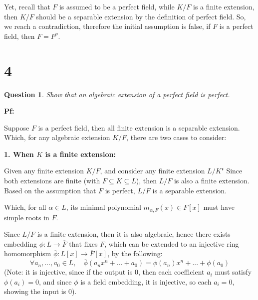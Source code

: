 \documentclass{article}
\newtheorem{question}{Question}
\begin{document}
Yet, recall that $F$ is assumed to be a perfect field, while $K/F$ is a finite extension, then $K/F$ should be a separable extension by the definition of perfect field. So, we reach a contradiction, therefore the initial assumption is false, if $F$ is a perfect field, then $F=F^p$.

\break

\section*{4}
\begin{myBox}[]{}
    \begin{question}
        Show that an algebraic extension of a perfect field is perfect.
    \end{question}
\end{myBox}

\textbf{Pf:}

Suppose $F$ is a perfect field, then all finite extension is a separable extension. Which, for any algebraic extension $K/F$, there are two cases to consider:

\hfil

\textbf{1. When $K$ is a finite extension:}

Given any finite extension $K/F$, and consider any finite extension $L/K$" Since both extensions are finite (with $F\subseteq K\subseteq L$), then $L/F$ is also a finite extension. Based on the assumption that $F$ is perfect, $L/F$ is a separable extension.

Which, for all $\alpha\in L$, its minimal polynomial $m_{\alpha,F}(x)\in F[x]$ must have simple roots in $\overline{F}$.

\hfil

Since $L/F$ is a finite extension, then it is also algebraic, hence there exists embedding $\phi:L\rightarrow\overline{F}$ that fixes $F$, which can be extended to an injective ring homomorphism $\overline{\phi}:L[x]\rightarrow\overline{F}[x]$, by the following:
$$\forall a_n,...,a_0\in L,\quad \overline{\phi}(a_nx^n+...+a_0)=\phi(a_n)x^n+...+\phi(a_0)$$
(Note: it is injective, since if the output is $0$, then each coefficient $a_i$ must satisfy $\phi(a_i)=0$, and since $\phi$ is a field embedding, it is injective, so each $a_i=0$, showing the input is $0$).
\end{document}
